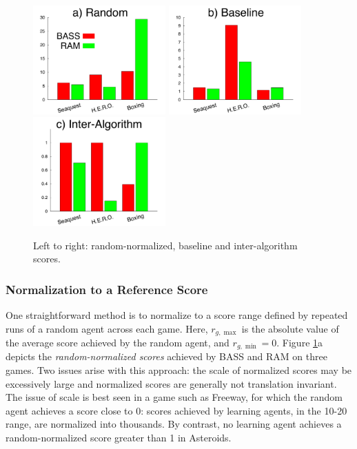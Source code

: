 \documentclass[twoside,11pt]{article}
\newcommand{\gamename}[1]{{\sc #1}}
\begin{document}
\begin{figure}
\begin{center}
\includegraphics[width=2in]{graphs/norm_random.pdf}
\hspace{-1em}
\includegraphics[width=2in]{graphs/norm_baselines.pdf}
\hspace{-1em}
\includegraphics[width=2in]{graphs/norm_algos.pdf}
\caption{Left to right: random-normalized, baseline and inter-algorithm scores.\label{fig:evaluation:normalized_scores}}
\end{center}
\end{figure}

\subsubsection{Normalization to a Reference Score}

One straightforward method is to normalize to a score range defined by repeated runs of a random agent across each game. Here, $r_{g,\max}$ is the absolute value of the average score achieved by the random agent, and $r_{g,\min} = 0$. 
Figure \ref{fig:evaluation:normalized_scores}a depicts the \emph{random-normalized scores} achieved by BASS and RAM on three games.  Two issues arise with this approach: the scale of normalized scores may be excessively large and normalized scores are generally not translation invariant. 
The issue of scale is best seen in a game such as \gamename{Freeway}, for which the random agent achieves a score close to 0: scores achieved by learning agents, in the 10-20 range, are normalized into thousands. 
By contrast, no learning agent achieves a random-normalized score greater than 1 in Asteroids. 
\end{document}
